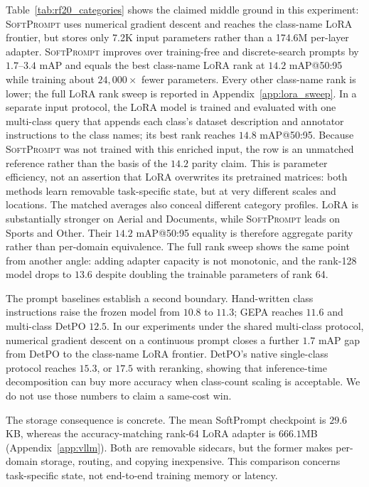 \documentclass{article}
\newcommand{\ours}{\textsc{SoftPrompt}}
\newcommand{\lora}{\textsc{LoRA}}
\begin{document}
Table~\ref{tab:rf20_categories} shows the claimed middle ground in this
experiment: \ours{} uses numerical gradient descent and reaches the class-name
\lora{} frontier, but stores only 7.2K input parameters rather than a 174.6M
per-layer adapter.
\ours{} improves over training-free and discrete-search prompts by
$1.7$--$3.4$ mAP and equals the best class-name \lora{} rank at $14.2$
mAP@50:95 while training about $24{,}000\times$ fewer parameters.
Every other class-name rank is lower; the full \lora{} rank sweep is reported
in Appendix~\ref{app:lora_sweep}.
In a separate input protocol, the \lora{} model is trained and evaluated with
one multi-class query that appends each class's dataset description and
annotator instructions to the class names; its best rank reaches $14.8$
mAP@50:95. Because \ours{} was not trained with this enriched input, the row is
an unmatched reference rather than the basis of the $14.2$ parity claim.
This is parameter efficiency, not an assertion that \lora{} overwrites its
pretrained matrices: both methods learn removable task-specific state, but at
very different scales and locations.
The matched averages also conceal different category profiles. \lora{} is
substantially stronger on Aerial and Documents, while \ours{} leads on Sports
and Other. Their $14.2$ mAP@50:95 equality is therefore aggregate parity rather than
per-domain equivalence. The full rank sweep shows the same point from another
angle: adding adapter capacity is not monotonic, and the rank-128 model drops
to $13.6$ despite doubling the trainable parameters of rank 64.

The prompt baselines establish a second boundary. Hand-written class
instructions raise the frozen model from $10.8$ to $11.3$; GEPA reaches $11.6$
and multi-class DetPO $12.5$. In our experiments under the shared multi-class
protocol, numerical gradient descent on a continuous prompt closes a further
$1.7$ mAP gap from DetPO to the class-name \lora{} frontier.
DetPO's native single-class protocol reaches
$15.3$, or $17.5$ with reranking, showing that inference-time decomposition can
buy more accuracy when class-count scaling is acceptable. We do not use those
numbers to claim a same-cost win.

The storage consequence is concrete. The mean SoftPrompt checkpoint is
$29.6$KB, whereas the accuracy-matching rank-64 \lora{} adapter is $666.1$MB
(Appendix~\ref{app:vllm}). Both are removable sidecars, but the former makes
per-domain storage, routing, and copying inexpensive. This comparison concerns
task-specific state, not end-to-end training memory or latency.
\end{document}
